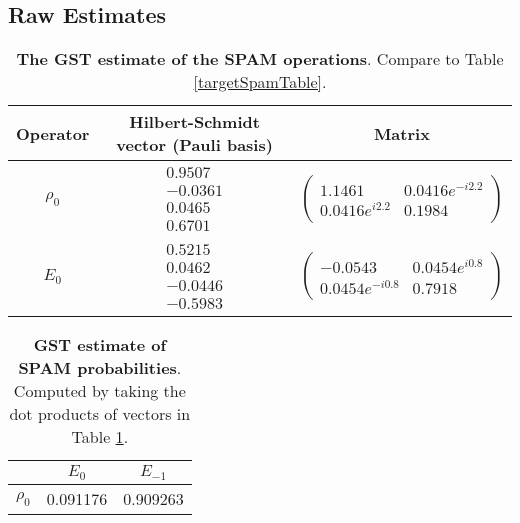 \documentclass{article}[11pt]
\begin{document}
\FloatBarrier

\subsection{Raw Estimates}

\begin{table}[h]
\begin{center}
\begin{tabular}[l]{|c|c|c|}
\hline
Operator & Hilbert-Schmidt vector (Pauli basis) & Matrix \\ \hline
$\rho_{0}$ & $ \begin{array}{c}
0.9507 \\ 
-0.0361 \\ 
0.0465 \\ 
0.6701
 \end{array} $
 & $ \left(\!\!\begin{array}{cc}
1.1461 & 0.0416e^{-i2.2} \\ 
0.0416e^{i2.2} & 0.1984
 \end{array}\!\!\right) $
 \\ \hline
$E_{0}$ & $ \begin{array}{c}
0.5215 \\ 
0.0462 \\ 
-0.0446 \\ 
-0.5983
 \end{array} $
 & $ \left(\!\!\begin{array}{cc}
-0.0543 & 0.0454e^{i0.8} \\ 
0.0454e^{-i0.8} & 0.7918
 \end{array}\!\!\right) $
 \\ \hline
\end{tabular}

\caption{\textbf{The GST estimate of the SPAM operations}.  Compare to Table \ref{targetSpamTable}.\label{bestGatesetSpamTable}}
\end{center}
\end{table}

\begin{table}[h]
\begin{center}
\begin{tabular}[l]{|c|c|c|}
\hline
 & $E_{0}$ & $E_{-1}$ \\ \hline
$\rho_{0}$ & 0.091176 & 0.909263 \\ \hline
\end{tabular}

\caption{\textbf{GST estimate of SPAM probabilities}.  Computed by taking the dot products of vectors in Table \ref{bestGatesetSpamTable}.\label{bestGatesetSpamParametersTable}}
\end{center}
\end{table}
\end{document}
